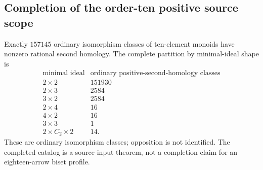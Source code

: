 \subsection{Completion of the order-ten positive source scope}

\begin{theorem}
\label{CP2:A-positive-corners-ten}
Exactly $157145$ ordinary isomorphism classes of ten-element
monoids have nonzero rational second homology. The complete
partition by minimal-ideal shape is
\[
\begin{array}{c|r}
\text{minimal ideal}&\text{ordinary positive-second-homology classes}\\\hline
2\times2&151930\\
2\times3&2584\\
3\times2&2584\\
2\times4&16\\
4\times2&16\\
3\times3&1\\
2\times C_2\times2&14.
\end{array}
\]
These are ordinary isomorphism classes; opposition is not
identified. The completed catalog is a source-input theorem,
not a completion claim for an eighteen-arrow biset profile.
\end{theorem}
